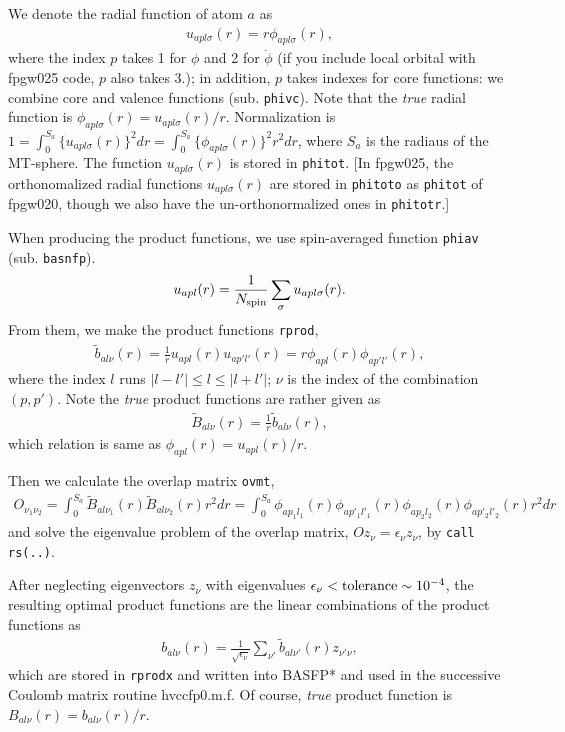 \documentclass[a4paper,10pt,epsf,fleqn]{article}
\begin{document}
{{{\begin{thebibliography}{00}
We denote the radial function of atom $a$ as
\begin{eqnarray}
   u_{apl\sigma}(r) = r \phi_{apl\sigma}(r),
\end{eqnarray}
where the index $p$ takes 1 for $\phi$ and 2 for $\dot{\phi}$
(if you include local orbital with fpgw025 code, $p$ also takes 3.);
in addition, $p$ takes indexes for core functions:
we combine core and valence functions (sub. \verb|phivc|). 
Note that the \textit{true} radial function is
$\phi_{apl\sigma}(r) = u_{apl\sigma}(r)/r$.
Normalization is 
$1=\int_0^{S_a} \{ u_{apl\sigma}(r) \}^2 dr = 
   \int_0^{S_a} \{ \phi_{apl\sigma}(r) \}^2 r^2dr$,
where $S_a$ is the radiaus of the MT-sphere.
The function $u_{apl\sigma}(r)$ is stored in \verb#phitot#.
[In fpgw025, the orthonomalized radial functions $u_{apl\sigma}(r)$
are stored in \verb#phitoto# as \verb#phitot# of fpgw020,
though we also have the un-orthonormalized ones in \verb#phitotr#.]


When producing the product functions,
we use spin-averaged function \verb#phiav# (sub. \verb|basnfp|).
\begin{eqnarray}
   u_{apl}(r) = \frac{1}{N_{\rm spin}}\sum_{\sigma}
   u_{apl\sigma}(r).
\end{eqnarray}
From them, we make the product functions \verb#rprod#,
\begin{eqnarray}
  \tilde{b}_{al\nu}(r) = \frac{1}{r}{u_{a p l }(r) u_{a p' l'}(r)}
  = r \phi_{a p l}(r) \phi_{a p' l'}(r),
\end{eqnarray}
where the index $l$ runs $|l-l'| \le l \le |l+l'|$;
$\nu$ is the index of the combination $(p,p')$.
Note the {\it true} product functions are rather given as
\begin{eqnarray}
  \tilde{B}_{al\nu}(r) = \frac{1}{r}\tilde{b}_{al\nu}(r),
\end{eqnarray}
which relation is same as $\phi_{apl}(r)=u_{apl}(r)/r$.

Then we calculate the overlap matrix \verb#ovmt#,
\begin{eqnarray}
  O_{\nu_1\nu_2} = \int_0^{S_a} 
  \tilde{B}_{al\nu_1}(r) \tilde{B}_{al\nu_2}(r) r^2 dr
  = \int_0^{S_a}  \phi_{a p_1 l_1}(r) \phi_{a p'_1 l'_1}(r)
                  \phi_{a p_2 l_2}(r) \phi_{a p'_2 l'_2}(r) r^2 dr
\end{eqnarray}
and solve the eigenvalue problem of the overlap matrix,
$Oz_{\nu}=\epsilon_{\nu} z_{\nu}$, by \verb#call rs(..)#. 


After neglecting eigenvectors
$z_{\nu}$ with eigenvalues $\epsilon_{\nu} < {\rm tolerance} \sim 10^{-4}$, 
the resulting optimal product functions are the linear combinations 
of the product functions as
\begin{eqnarray}
   b_{al\nu}(r) = \frac{1}{\sqrt{\epsilon_{\nu}}}
   \sum_{\nu'}\tilde{b}_{al\nu'}(r)z_{\nu'\nu},
\end{eqnarray}
which are stored in \verb#rprodx# and written into {\sf BASFP*}
and used in the successive Coulomb matrix routine {\sf hvccfp0.m.f}.
Of course, \textit{true} product function is 
$B_{al\nu}(r) = b_{al\nu}(r)/r$.


\end{thebibliography}}}}
\end{document}
